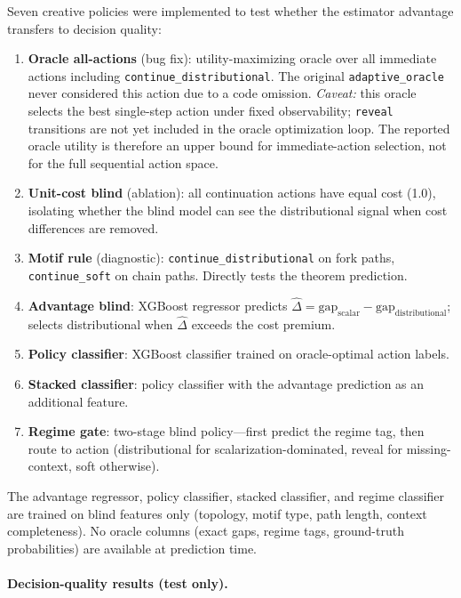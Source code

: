 \documentclass[11pt,openany]{report}
\begin{document}
Seven creative policies were implemented to test whether the estimator
advantage transfers to decision quality:

\begin{enumerate}
\item \textbf{Oracle all-actions} (bug fix): utility-maximizing oracle
  over all immediate actions including \texttt{continue\_distributional}.
  The original \texttt{adaptive\_oracle} never considered this action
  due to a code omission.  \emph{Caveat:} this oracle selects the best
  single-step action under fixed observability; \texttt{reveal} transitions
  are not yet included in the oracle optimization loop.  The reported oracle
  utility is therefore an upper bound for immediate-action selection, not
  for the full sequential action space.
\item \textbf{Unit-cost blind} (ablation): all continuation actions
  have equal cost (1.0), isolating whether the blind model can see the
  distributional signal when cost differences are removed.
\item \textbf{Motif rule} (diagnostic): \texttt{continue\_distributional}
  on fork paths, \texttt{continue\_soft} on chain paths.
  Directly tests the theorem prediction.
\item \textbf{Advantage blind}: XGBoost regressor predicts
  $\hat{\Delta} = \mathrm{gap}_{\mathrm{scalar}} - \mathrm{gap}_{\mathrm{distributional}}$;
  selects distributional when $\hat{\Delta}$ exceeds the cost premium.
\item \textbf{Policy classifier}: XGBoost classifier trained on
  oracle-optimal action labels.
\item \textbf{Stacked classifier}: policy classifier with the advantage
  prediction as an additional feature.
\item \textbf{Regime gate}: two-stage blind policy---first predict the
  regime tag, then route to action (distributional for
  scalarization-dominated, reveal for missing-context, soft otherwise).
\end{enumerate}

The advantage regressor, policy classifier, stacked classifier, and
regime classifier are trained on blind features only (topology,
motif type, path length, context completeness).  No oracle columns
(exact gaps, regime tags, ground-truth probabilities) are available
at prediction time.

\paragraph{Decision-quality results (test only).}
\end{document}
